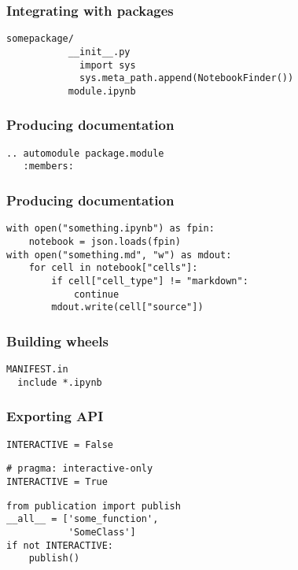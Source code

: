 \begin{frame}[fragile]
\frametitle{Integrating with packages}

\begin{lstlisting}
somepackage/
           __init__.py
             import sys
             sys.meta_path.append(NotebookFinder())
           module.ipynb
\end{lstlisting}

\end{frame}


\begin{frame}[fragile]
\frametitle{Producing documentation}

\begin{lstlisting}
.. automodule package.module
   :members:
\end{lstlisting}

\end{frame}

\begin{frame}[fragile]
\frametitle{Producing documentation}

\begin{lstlisting}
with open("something.ipynb") as fpin:
    notebook = json.loads(fpin)
with open("something.md", "w") as mdout:
    for cell in notebook["cells"]:
        if cell["cell_type"] != "markdown":
            continue
        mdout.write(cell["source"])
\end{lstlisting}

\end{frame}


\begin{frame}[fragile]
\frametitle{Building wheels}

\begin{lstlisting}
MANIFEST.in
  include *.ipynb
\end{lstlisting}

\end{frame}

\begin{frame}[fragile]
\frametitle{Exporting API}

\begin{lstlisting}[frame=single]
INTERACTIVE = False
\end{lstlisting}

\begin{lstlisting}[frame=single]
# pragma: interactive-only 
INTERACTIVE = True
\end{lstlisting}

\begin{lstlisting}[frame=single]
from publication import publish
__all__ = ['some_function',
           'SomeClass']
if not INTERACTIVE:
    publish()
\end{lstlisting}

\end{frame}

